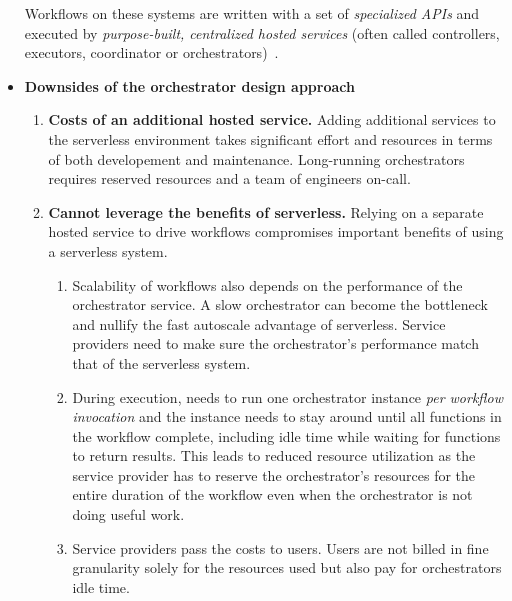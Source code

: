 \begin{itemize}
  Workflows on these systems are written with a set of \emph{specialized APIs}
  and executed by \emph{purpose-built, centralized hosted services}
  (often called controllers, executors, coordinator or
  orchestrators)~\cite{gg-atc, excamera, kappa, triggerflow, pywren,
  durable-functions, aws-step-functions, google-cloud-composer,
  google-workflows}.

  \item \textbf{Downsides of the orchestrator design approach}

    \begin{enumerate}
      \item \textbf{Costs of an additional hosted service.} Adding additional
      services to the serverless environment takes significant effort and
      resources in terms of both developement and maintenance. Long-running
      orchestrators requires reserved resources and a team of engineers
      on-call.

      \item \textbf{Cannot leverage the benefits of serverless.} Relying on a
      separate hosted service to drive workflows compromises important
      benefits of using a serverless system.

        \begin{enumerate}

          \item Scalability of workflows also depends on the performance of
          the orchestrator service. A slow orchestrator can become the
          bottleneck and nullify the fast autoscale advantage of serverless.
          Service providers need to make sure the orchestrator's performance
          match that of the serverless system.

          \item During execution, needs to run one orchestrator instance
          \emph{per workflow invocation} and the instance needs to stay around
          until all functions in the workflow complete, including idle time
          while waiting for functions to return results. This leads to reduced
          resource utilization as the service provider has to reserve the
          orchestrator's resources for the entire duration of the workflow
          even when the orchestrator is not doing useful work.

          \item Service providers pass the costs to users. Users are not
          billed in fine granularity solely for the resources used but also
          pay for orchestrators idle time.


\end{enumerate}
\end{enumerate}
\end{itemize}
